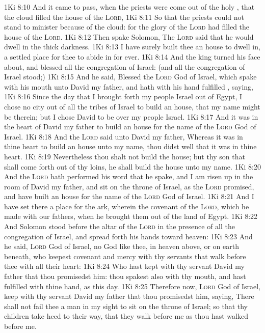 \vs 1Ki 8:10 And it came to pass, when the priests were come out of the holy , that the cloud filled the house of the \textsc{Lord},
\vs 1Ki 8:11 So that the priests could not stand to minister because of the cloud: for the glory of the \textsc{Lord} had filled the house of the \textsc{Lord}.
\vs 1Ki 8:12 Then spake Solomon, The \textsc{Lord} said that he would dwell in the thick darkness.
\vs 1Ki 8:13 I have surely built thee an house to dwell in, a settled place for thee to abide in for ever.
\vs 1Ki 8:14 And the king turned his face about, and blessed all the congregation of Israel: (and all the congregation of Israel stood;)
\vs 1Ki 8:15 And he said, Blessed  the \textsc{Lord} God of Israel, which spake with his mouth unto David my father, and hath with his hand fulfilled , saying,
\vs 1Ki 8:16 Since the day that I brought forth my people Israel out of Egypt, I chose no city out of all the tribes of Israel to build an house, that my name might be therein; but I chose David to be over my people Israel.
\vs 1Ki 8:17 And it was in the heart of David my father to build an house for the name of the \textsc{Lord} God of Israel.
\vs 1Ki 8:18 And the \textsc{Lord} said unto David my father, Whereas it was in thine heart to build an house unto my name, thou didst well that it was in thine heart.
\vs 1Ki 8:19 Nevertheless thou shalt not build the house; but thy son that shall come forth out of thy loins, he shall build the house unto my name.
\vs 1Ki 8:20 And the \textsc{Lord} hath performed his word that he spake, and I am risen up in the room of David my father, and sit on the throne of Israel, as the \textsc{Lord} promised, and have built an house for the name of the \textsc{Lord} God of Israel.
\vs 1Ki 8:21 And I have set there a place for the ark, wherein  the covenant of the \textsc{Lord}, which he made with our fathers, when he brought them out of the land of Egypt.
\vs 1Ki 8:22 And Solomon stood before the altar of the \textsc{Lord} in the presence of all the congregation of Israel, and spread forth his hands toward heaven:
\vs 1Ki 8:23 And he said, \textsc{Lord} God of Israel,  no God like thee, in heaven above, or on earth beneath, who keepest covenant and mercy with thy servants that walk before thee with all their heart:
\vs 1Ki 8:24 Who hast kept with thy servant David my father that thou promisedst him: thou spakest also with thy mouth, and hast fulfilled  with thine hand, as  this day.
\vs 1Ki 8:25 Therefore now, \textsc{Lord} God of Israel, keep with thy servant David my father that thou promisedst him, saying, There shall not fail thee a man in my sight to sit on the throne of Israel; so that thy children take heed to their way, that they walk before me as thou hast walked before me.
